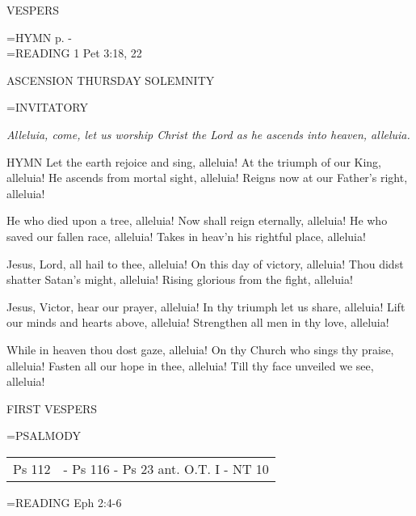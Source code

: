 \begin{flushleft}\normalsize VESPERS\\\end{flushleft}
\hangindent=\parindent \small{\uppercase{HYMN} p. \pageref{easter:firstHymn}-\pageref{easter:lastHymn}\\}
\hangindent=\parindent \small{\uppercase{READING}}    1 Pet 3:18, 22 \textbf{   \\}

ASCENSION THURSDAY
SOLEMNITY

\hangindent=\parindent \small{INVITATORY}
\begin{center}
\textit{Alleluia, come, let us worship Christ the Lord as he ascends into heaven, alleluia.\\}
\end{center}

HYMN
Let the earth rejoice and sing, alleluia!
At the triumph of our King, alleluia!
He ascends from mortal sight, alleluia!
Reigns now at our Father's right, alleluia!

He who died upon a tree, alleluia!
Now shall reign eternally, alleluia!
He who saved our fallen race, alleluia!
Takes in heav'n his rightful place, alleluia!

Jesus, Lord, all hail to thee, alleluia!
On this day of victory, alleluia!
Thou didst shatter Satan's might, alleluia!
Rising glorious from the fight, alleluia!

Jesus, Victor, hear our prayer, alleluia!
In thy triumph let us share, alleluia!
Lift our minds and hearts above, alleluia!
Strengthen all men in thy love, alleluia!

While in heaven thou dost gaze, alleluia!
On thy Church who sings thy praise, alleluia!
Fasten all our hope in thee, alleluia!
Till thy face unveiled we see, alleluia!

\begin{flushleft}\normalsize FIRST VESPERS\\\end{flushleft}
\hangindent=\parindent \small{PSALMODY}
\begin{center}
\begin{tabular}{ l l }
Ps 112 &  - Ps 116 - Ps 23 ant. O.T. I - NT 10\\
\end{tabular}
\end{center}		

\hangindent=\parindent \small{\uppercase{READING}}    Eph 2:4-6 \textbf{   \\}

